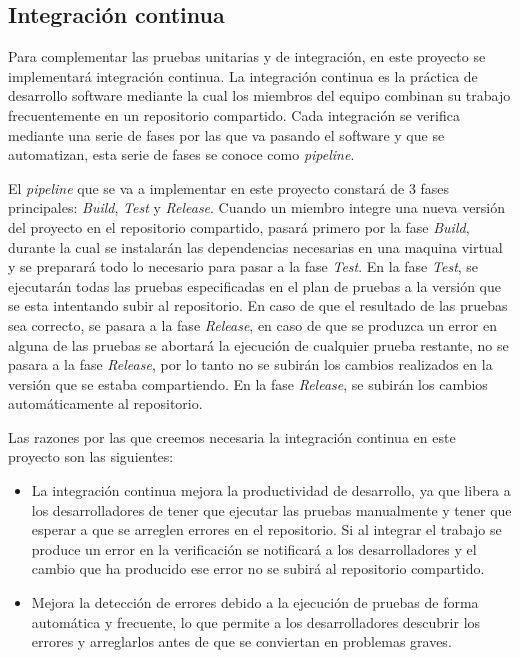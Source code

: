 \subsection{Integración continua}
Para complementar las pruebas unitarias y de integración, en este proyecto se implementará integración continua. La integración continua es la práctica de desarrollo software mediante la cual los miembros del equipo combinan su trabajo frecuentemente en un repositorio compartido. Cada integración se verifica mediante una serie de fases por las que va pasando el software y que se automatizan, esta serie de fases se conoce como \textit{pipeline}.

El \textit{pipeline} que se va a implementar en este proyecto constará de 3 fases principales: \textit{Build}, \textit{Test} y \textit{Release}. Cuando un miembro integre una nueva versión del proyecto en el repositorio compartido, pasará primero por la fase \textit{Build}, durante la cual se instalarán las dependencias necesarias en una maquina virtual y se preparará todo lo necesario para pasar a la fase \textit{Test}. En la fase \textit{Test}, se ejecutarán todas las pruebas especificadas en el plan de pruebas a la versión que se esta intentando subir al repositorio. En caso de que el resultado de las pruebas sea correcto, se pasara a la fase \textit{Release}, en caso de que se produzca un error en alguna de las pruebas se abortará la ejecución de cualquier prueba restante, no se pasara a la fase \textit{Release}, por lo tanto no se subirán los cambios realizados en la versión que se estaba compartiendo. En la fase \textit{Release}, se subirán los cambios automáticamente al repositorio.

Las razones por las que creemos necesaria la integración continua en este proyecto son las siguientes:
\begin{itemize}
    \item La integración continua mejora la productividad de desarrollo, ya que libera a los desarrolladores de tener que ejecutar las pruebas manualmente y tener que esperar a que se arreglen errores en el repositorio. Si al integrar el trabajo se produce un error en la verificación se notificará a los desarrolladores y el cambio que ha producido ese error no se subirá al repositorio compartido.
    \item Mejora la detección de errores debido a la ejecución de pruebas de forma automática y frecuente, lo que permite a los desarrolladores descubrir los errores y arreglarlos antes de que se conviertan en problemas graves.
\end{itemize}

